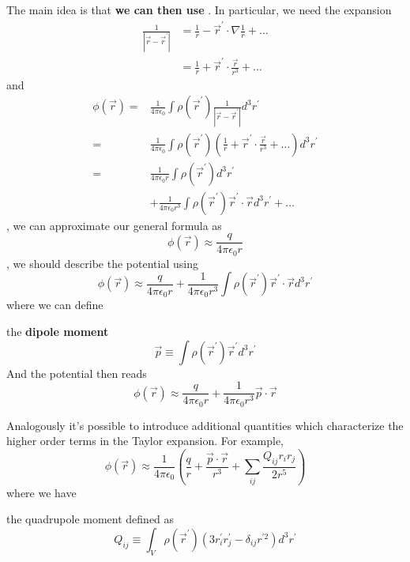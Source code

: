 The main idea is that \textbf{we can then use }. In particular, we need the expansion
\begin{equation}
\begin{aligned}
\frac{1}{\left|\vec{r}-\vec{r}^{\prime}\right|} &=\frac{1}{r}-\vec{r}^{\prime} \cdot \nabla \frac{1}{r}+\ldots \\
&=\frac{1}{r}+\vec{r}^{\prime} \cdot \frac{\vec{r}}{r^{3}}+\ldots
\end{aligned}
\end{equation}
and
\begin{equation}
\begin{aligned}
\phi(\vec{r})=& \frac{1}{4 \pi \epsilon_{0}} \int \rho\left(\vec{r}^{\prime}\right) \frac{1}{\left|\vec{r}-\vec{r}^{\prime}\right|} d^{3} r^{\prime} \\
=& \frac{1}{4 \pi \epsilon_{0}} \int \rho\left(\vec{r}^{\prime}\right)\left(\frac{1}{r}+\vec{r}^{\prime} \cdot \frac{\vec{r}}{r^{3}}+\ldots\right) d^{3} r^{\prime} \\
=& \frac{1}{4 \pi \epsilon_{0} r} \int \rho\left(\vec{r}^{\prime}\right) d^{3} r^{\prime} \\
&+\frac{1}{4 \pi \epsilon_{0} r^{3}} \int \rho\left(\vec{r}^{\prime}\right) \vec{r}^{\prime} \cdot \vec{r} d^{3} r^{\prime}+\ldots
\end{aligned}
\end{equation}
, we can approximate our general formula as
$$
\phi(\vec{r}) \approx \frac{q}{4 \pi \epsilon_{0} r}
$$
, we should describe the potential using
$$
\phi(\vec{r}) \approx \frac{q}{4 \pi \epsilon_{0} r}+\frac{1}{4 \pi \epsilon_{0} r^{3}} \int \rho\left(\vec{r}^{\prime}\right) \vec{r}^{\prime} \cdot \vec{r} d^{3} r^{\prime}
$$
where we can define
\begin{qt}
the \textbf{dipole moment}
\begin{equation}
\vec{p} \equiv \int \rho\left(\vec{r}^{\prime}\right) \vec{r}^{\prime} d^{3} r^{\prime}
\label{dipoleMoment}
\end{equation}
And the potential then reads
$$
\phi(\vec{r}) \approx \frac{q}{4 \pi \epsilon_{0} r}+\frac{1}{4 \pi \epsilon_{0} r^{3}} \vec{p} \cdot \vec{r}
$$
\end{qt}
Analogously it’s possible to introduce additional quantities which characterize the higher order terms in the Taylor expansion.
For example,
$$
\phi(\vec{r}) \approx \frac{1}{4 \pi \epsilon_{0}}\left(\frac{q}{r}+\frac{\vec{p} \cdot \vec{r}}{r^{3}}+\sum_{i j} \frac{Q_{i j} r_{i} r_{j}}{2 r^{5}}\right)
$$
where we have
\begin{qt}
the quadrupole moment defined as
\begin{equation}
Q_{i j} \equiv \int_{V} \rho\left(\vec{r}^{\prime}\right)\left(3 r_{i}^{\prime} r_{j}^{\prime}-\delta_{i j} r^{\prime 2}\right) d^{3} r^{\prime}
\label{quadrupoleMoment}
\end{equation}
\end{qt}

